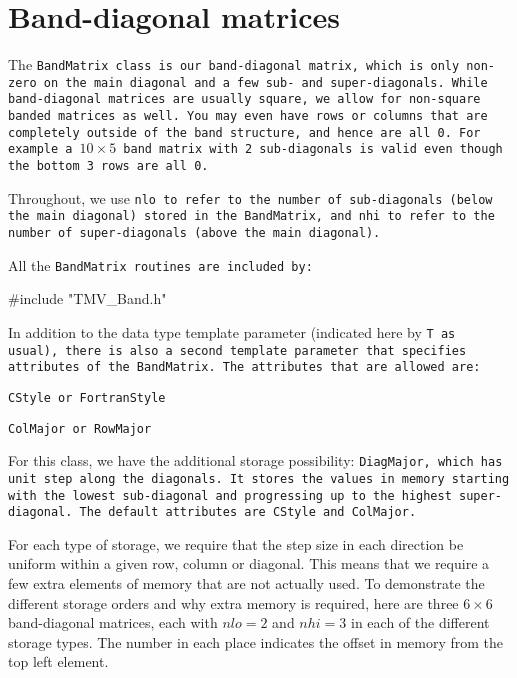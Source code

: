
\section{Band-diagonal matrices}
\label{BandMatrix}

The \tt{BandMatrix} class is our band-diagonal matrix, which is only non-zero
on the main diagonal and a few sub- and super-diagonals.  While band-diagonal
matrices are usually square, we allow for non-square banded matrices as well.
You may even have rows or columns that are completely outside of the 
band structure, and hence are all 0.  For example a $10\times 5$ band matrix
with 2 sub-diagonals is valid even though the bottom 3 rows are all 0.

Throughout, we use \tt{nlo} to refer to the number of sub-diagonals 
(below the main diagonal) stored
in the \tt{BandMatrix}, and \tt{nhi} to refer to the number of super-diagonals
(above the main diagonal).

All the \tt{BandMatrix} routines are included by:
\begin{tmvcode}
#include "TMV_Band.h"
\end{tmvcode}

In addition to the data type template parameter (indicated here by \tt{T} as usual),
there is also a second template parameter that specifies attributes of the
\tt{BandMatrix}.  The attributes that are allowed are:
\begin{description} \itemsep -2pt
\item[$\bullet$] \tt{CStyle} or \tt{FortranStyle}
\item[$\bullet$] \tt{ColMajor} or \tt{RowMajor}
\end{description}
For this class, we have the additional storage possibility: \tt{DiagMajor},
which has unit step along the diagonals.  It stores the values in memory
starting with the lowest sub-diagonal and progressing up to the highest
super-diagonal.
The default attributes are \tt{CStyle} and \tt{ColMajor}.

For each type of storage, we require that the step size in each direction
be uniform within a given row, column or diagonal. 
This means that we require a few extra elements
of memory that are not actually used.
To demonstrate the different storage orders and why extra memory is required, 
here are three $6 \times 6$ band-diagonal
matrices, each with $nlo = 2$ and $nhi = 3$ in each of the different storage
types.  The number in each place indicates the offset in memory from the 
top left element.

